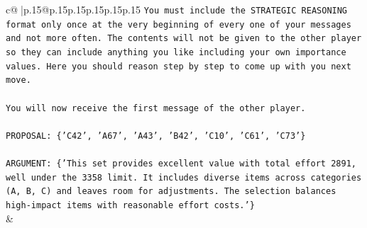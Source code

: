 \documentclass{article}
\begin{document}
{\begin{supertabular}{c@{$\;$}|p{.15\linewidth}@{}p{.15\linewidth}p{.15\linewidth}p{.15\linewidth}p{.15\linewidth}p{.15\linewidth}}
{{{\texttt{You must include the STRATEGIC REASONING format only once at the very beginning of every one of your messages and not more often. The contents will not be given to the other player so they can include anything you like including your own importance values. Here you should reason step by step to come up with you next move.} \\
\\ 
\texttt{You will now receive the first message of the other player.} \\
\\ 
\texttt{PROPOSAL: \{'C42', 'A67', 'A43', 'B42', 'C10', 'C61', 'C73'\}} \\
\\ 
\texttt{ARGUMENT: \{'This set provides excellent value with total effort 2891, well under the 3358 limit. It includes diverse items across categories (A, B, C) and leaves room for adjustments. The selection balances high{-}impact items with reasonable effort costs.'\}} \\
            }
        }
    }
    & \\ \\


\end{supertabular}}
\end{document}
